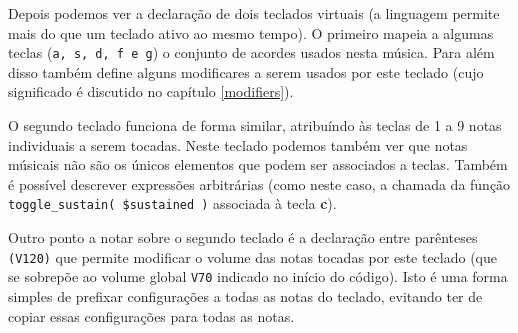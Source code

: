 Depois podemos ver a declaração de dois teclados virtuais (a linguagem permite mais do que um teclado ativo ao mesmo tempo). O primeiro mapeia a algumas teclas (\texttt{a, s, d, f e g}) o conjunto de acordes usados nesta música. Para além disso também define alguns modificares a serem usados por este teclado (cujo significado é discutido no capítulo \ref{modifiers}).

O segundo teclado funciona de forma similar, atribuíndo às teclas de 1 a 9 notas individuais a serem tocadas. Neste teclado podemos também ver que notas músicais não são os únicos elementos que podem ser associados a teclas. Também é possível descrever expressões arbitrárias (como neste caso, a chamada da função \texttt{toggle\_sustain( \$sustained )} associada à tecla \textbf{c}).

Outro ponto a notar sobre o segundo teclado é a declaração entre parênteses \texttt{(V120)} que permite modificar o volume das notas tocadas por este teclado (que se sobrepõe ao volume global \texttt{V70} indicado no início do código). Isto é uma forma simples de prefixar configurações a todas as notas do teclado, evitando ter de copiar essas configurações para todas as notas.

